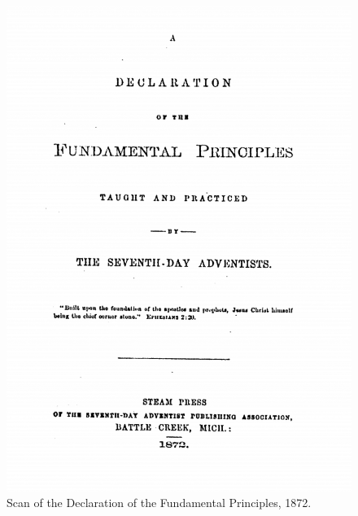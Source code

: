 \begin{figure}
    \centering
    \includegraphics[width=1\linewidth]{images/declaration-of-the-fundamental-principles.PNG}
    \caption*{Scan of the Declaration of the Fundamental Principles, 1872.}
    \label{fig:declaration-of-the-fundamental-principles}
\end{figure}

